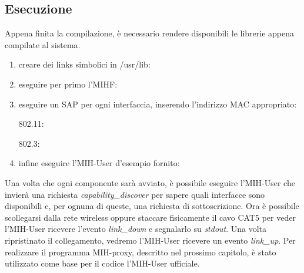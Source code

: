\subsection{Esecuzione}

Appena finita la compilazione, è necessario rendere disponibili le librerie appena compilate al sistema.

\begin{enumerate}

\item creare dei links simbolici in /usr/lib:\\

\item eseguire per primo l'MIHF:\\

\item eseguire un SAP per ogni interfaccia, inserendo l'indirizzo MAC appropriato:

802.11:\\

802.3:\\

\item infine eseguire l'MIH-User d'esempio fornito:\\

\end{enumerate}

Una volta che ogni componente sarà avviato, è possibile eseguire l'MIH-User che invierà una richiesta {\em capability\_discover} per sapere quali interfacce sono disponibili e, per ognuna di queste, una richiesta di sottoscrizione. Ora è possibile scollegarsi dalla rete wireless oppure staccare fisicamente il cavo CAT5 per veder l'MIH-User ricevere l'evento {\em link\_down} e segnalarlo su {\em stdout}. Una volta ripristinato il collegamento, vedremo l'MIH-User ricevere un evento {\em link\_up}. Per realizzare il programma MIH-proxy, descritto nel prossimo capitolo, è stato utilizzato come base per il codice l'MIH-User ufficiale.

